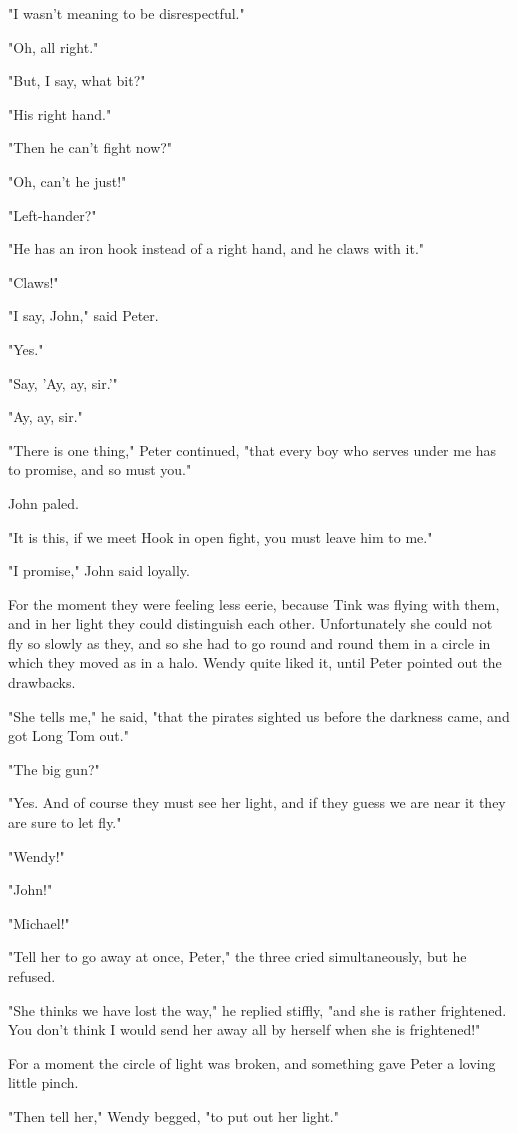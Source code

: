 "I wasn't meaning to be disrespectful."

"Oh, all right."

"But, I say, what bit?"

"His right hand."

"Then he can't fight now?"

"Oh, can't he just!"

"Left-hander?"

"He has an iron hook instead of a right hand,
and he claws with it."

"Claws!"

"I say, John," said Peter.

"Yes."

"Say, 'Ay, ay, sir.'"

"Ay, ay, sir."

"There is one thing," Peter continued,
"that every boy who serves under me has to promise,
and so must you."

John paled.

"It is this, if we meet Hook in open fight,
you must leave him to me."

"I promise," John said loyally.

For the moment they were feeling less eerie,
because Tink was flying with them, and in her light they could distinguish each other.
Unfortunately she could not fly so slowly as they,
and so she had to go round and round them in a circle in which they moved as in a halo.
Wendy quite liked it, until Peter pointed out the drawbacks.

"She tells me," he said, "that the pirates sighted us before the darkness came,
and got Long Tom out."

"The big gun?"

"Yes.
And of course they must see her light,
and if they guess we are near it they are sure to let fly."

"Wendy!"

"John!"

"Michael!"

"Tell her to go away at once, Peter," the three cried simultaneously, but he refused.

"She thinks we have lost the way," he replied stiffly, "and she is rather frightened.
You don't think I would send her away all by herself when she is frightened!"

For a moment the circle of light was broken, and something gave Peter a loving little pinch.

"Then tell her," Wendy begged, "to put out her light."

